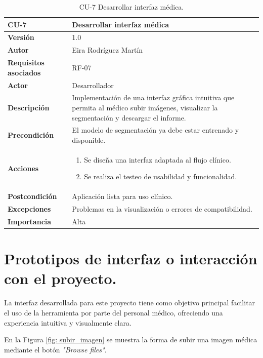 \begin{table}[!h]
	\centering
	\begin{tabularx}{\linewidth}{ p{} p{} }
		\toprule
		\textbf{CU-7}    & \textbf{Desarrollar interfaz médica}\\
		\toprule
		\textbf{Versión}              & 1.0    \\
		\textbf{Autor}                & Eira Rodríguez Martín \\
		\textbf{Requisitos asociados} & RF-07 \\
        \textbf{Actor}                & Desarrollador \\
		\textbf{Descripción}          & Implementación de una interfaz gráfica intuitiva que permita al médico subir imágenes, visualizar la segmentación y descargar el informe.\\
		\textbf{Precondición}         & El modelo de segmentación ya debe estar entrenado y disponible. \\
		\textbf{Acciones}             &
		\begin{enumerate}
			\def\labelenumi{\arabic{enumi}.}
			\tightlist
			\item Se diseña una interfaz adaptada al flujo clínico.
			\item Se realiza el testeo de usabilidad y funcionalidad.
		\end{enumerate}\\
		\textbf{Postcondición}        & Aplicación lista para uso clínico. \\
		\textbf{Excepciones}          & Problemas en la visualización o errores de compatibilidad. \\
		\textbf{Importancia}          & Alta \\
		\bottomrule
	\end{tabularx}
	\caption{CU-7 Desarrollar interfaz médica.}
\end{table}
\FloatBarrier
\section{Prototipos de interfaz o interacción con el proyecto.}

La interfaz desarrollada para este proyecto tiene como objetivo principal facilitar el uso de la herramienta por parte del personal médico, ofreciendo una experiencia intuitiva y visualmente clara. 

En la Figura \ref{fig: subir_imagen} se muestra la forma de subir una imagen médica mediante el botón \textit{"Browse files"}.

